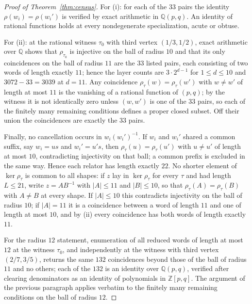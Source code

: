 \documentclass[11pt]{article}
\theoremstyle{definition}
\theoremstyle{remark}
\newcommand{\Z}{\mathbb{Z}}
\newcommand{\Q}{\mathbb{Q}}
\begin{document}
\begin{proof}[Proof of Theorem~\ref{thm:census}]
For (i): for each of the $33$ pairs the identity $\rho(w_i)=\rho(w_i')$ is
verified by exact arithmetic in $\Q(p,q)$. An identity of rational functions
holds at every nondegenerate specialization, acute or obtuse.

For (ii): at the rational witness $\tau_0$ with third vertex $(1/3,1/2)$, exact
arithmetic over $\Q$ shows that $\rho_{\tau_0}$ is injective on the ball of
radius $10$ and that its only coincidences on the ball of radius $11$ are the
$33$ listed pairs, each consisting of two words of length exactly $11$; hence
the layer counts are $3\cdot2^{d-1}$ for $1\le d\le10$ and $3072-33=3039$ at
$d=11$. Any coincidence $\rho_\tau(w)=\rho_\tau(w')$ with $w\neq w'$ of length
at most $11$ is the vanishing of a rational function of $(p,q)$; by the witness
it is not identically zero unless $(w,w')$ is one of the $33$ pairs, so each of
the finitely many remaining conditions defines a proper closed subset. Off their
union the coincidences are exactly the $33$ pairs.

Finally, no cancellation occurs in $w_i(w_i')^{-1}$. If $w_i$ and $w_i'$ shared a
common suffix, say $w_i=us$ and $w_i'=u's$, then $\rho_\tau(u)=\rho_\tau(u')$
with $u\neq u'$ of length at most $10$, contradicting injectivity on that ball;
a common prefix is excluded in the same way. Hence each relator has length
exactly $22$. No shorter element of $\ker\rho_\tau$ is common to all shapes: if
$z$ lay in $\ker\rho_\tau$ for every $\tau$ and had length $L\le21$, write
$z=AB^{-1}$ with $|A|\le11$ and $|B|\le10$, so that $\rho_\tau(A)=\rho_\tau(B)$
with $A\neq B$ at every shape. If $|A|\le10$ this contradicts injectivity on the
ball of radius $10$; if $|A|=11$ it is a coincidence between a word of length
$11$ and one of length at most $10$, and by (ii) every coincidence has both words
of length exactly $11$.

For the radius $12$ statement, enumeration of all reduced words of length at
most $12$ at the witness $\tau_0$, and independently at the witness with third
vertex $(2/7,3/5)$, returns the same $132$ coincidences beyond those of the
ball of radius $11$ and no others; each of the $132$ is an identity over
$\Q(p,q)$, verified after clearing denominators as an identity of polynomials
in $\Z[p,q]$. The argument of the previous paragraph applies verbatim to the
finitely many remaining conditions on the ball of radius $12$.
\end{proof}
\end{document}
